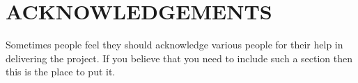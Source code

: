 \chapter*{ACKNOWLEDGEMENTS}
Sometimes people feel they should acknowledge various people for their help in delivering the
project. If you believe that you need to include such a section then this is the place to put it.